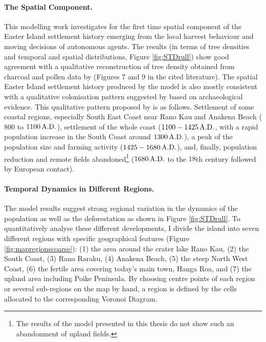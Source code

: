 \paragraph{The Spatial Component.}
This modelling work investigates for the first time spatial component of the Easter Island settlement history emerging from the local harvest behaviour and moving decisions of autonomous agents.
The results (in terms of tree densities and temporal and spatial distributions, Figure \ref{fig:STDrull}) show good agreement with a qualitative reconstruction of tree density obtained from charcoal and pollen data by \citet{Rull2020} (Figures 7 and 9 in the cited literature).
The spatial Easter Island settlement history produced by the model is also mostly consistent with a qualitative colonisation pattern suggested by \citet{Bahn2017} based on archaeological evidence.
This qualitative pattern proposed by \citet{Bahn2017} is as follows.
Settlement of some coastal regions, especially South East Coast near Rano Kau and Anakena Beach ($800$ to $1100\, {\rm A.D.}$), settlement of the whole coast ($1100-1425\,{\rm A.D.}$, with a rapid population increase in the South Coast around $1300\, {\rm A.D.}$), a peak of the population size and farming activity ($1425-1680\, {\rm A.D.}$), and, finally, population reduction and remote fields abandoned\footnote{The results of the model presented in this thesis do not show such an abandonment of upland fields.} ($1680\,{\rm A.D.}$ to the $18$th century followed by European contact).


\paragraph{Temporal Dynamics in Different Regions.}
The model results suggest strong regional variation in the dynamics of the population as well as the deforestation as shown in Figure \ref{fig:STDrull}. 
To quantitatively analyse these different developments, I divide the island into seven different regions with specific geographical features (Figure \ref{fig:mapregionscoarse}): (1) the area around the crater lake Rano Kau, (2) the South Coast, (3) Rano Raraku, (4) Anakena Beach, (5) the steep North West Coast, (6) the fertile area covering today's main town, Hanga Roa, and (7) the upland area including Poike Peninsula. 
By choosing centre points of each region or several sub-regions on the map by hand, a region is defined by the cells allocated to the corresponding Voronoi Diagram.

